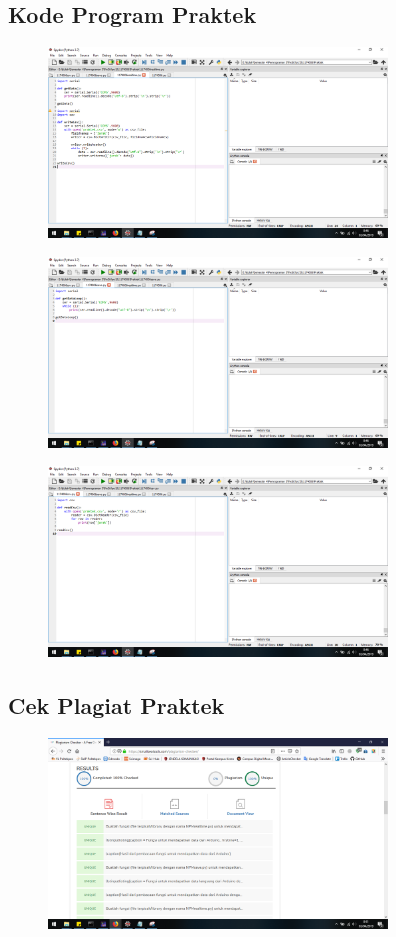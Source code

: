 \subsection{Kode Program Praktek}
\begin{figure}[H]
	\includegraphics[width=9cm]{figures/5/1174006/Praktek/realtime.png}
	\centering
\end{figure}

\begin{figure}[H]
	\includegraphics[width=9cm]{figures/5/1174006/Praktek/save.png}
	\centering
\end{figure}

\begin{figure}[H]
	\includegraphics[width=9cm]{figures/5/1174006/Praktek/csv.png}
	\centering
\end{figure}

\subsection{Cek Plagiat Praktek}
\begin{figure}[H]
	\includegraphics[width=9cm]{figures/5/1174006/Praktek/plagiatpraktek.png}
	\centering
\end{figure}

